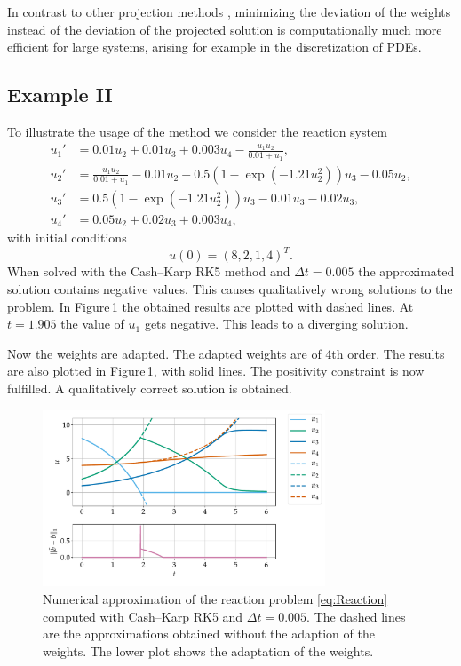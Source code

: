 \documentclass[a4paper]{article}
\numberwithin{equation}{section}
\theoremstyle{plain}
\theoremstyle{definition}
\numberwithin{theorem}{section}
\newcommand{\dt}{{\Delta t}}
\newcommand{\1}{\mathbbm{1}}
\begin{document}
In contrast to other projection methods
\cite{shampine1986conservation,sandu2001positive},
minimizing the deviation of the weights instead of the deviation
of the projected solution is computationally much more efficient
for large systems, arising for example in the discretization of
PDEs.


\subsection{Example II}\label{sec:example_reac}

To illustrate the usage of the method we consider the reaction system
\cite{kopecz_comparison_2019}
\begin{subequations}
\label{eq:Reaction}
\begin{align}
u_1' &= 0.01u_2 + 0.01 u_3 +0.003u_4 - \frac{u_1 u_2}{0.01+u_1}, \\
u_2' &= \frac{u_1u_2}{0.01+u_1}-0.01 u_2-0.5(1-\exp(-1.21 u_2^2)) u_3 -0.05 u_2, \\
u_3' &= 0.5(1-\exp(-1.21u_2^2)) u_3 - 0.01 u_3 -0.02 u_3, \\
u_4' &=0.05 u_2 + 0.02 u_3 + 0.003u_4,
\end{align}
\end{subequations}
with initial conditions
\begin{equation}
u(0) = (8,2,1,4)^T.
\end{equation}
When solved with the Cash--Karp RK5 method \cite{cash1990variable} and $\dt = 0.005$ the approximated solution contains negative values. This causes qualitatively wrong solutions to the problem.
In Figure\,\ref{fig:exampleI} the obtained results are plotted with dashed lines.
At $t=1.905$ the value of $u_1$ gets negative. This leads to a diverging solution.

Now the weights are adapted. The adapted weights are of 4th order. The results are also plotted in Figure\,\ref{fig:exampleI}, with solid lines.
The positivity constraint is now fulfilled. A qualitatively correct solution is obtained.

\begin{figure}[ht]
    \centering
    \includegraphics[width=0.75\textwidth]{plots/exampleI.pdf}
    \caption{Numerical approximation of the reaction problem \eqref{eq:Reaction} computed with Cash--Karp RK5 and $\dt = 0.005$. The dashed lines are the approximations obtained without the adaption of the weights. The lower plot shows the adaptation of the weights. }
    \label{fig:exampleI}
\end{figure}
\end{document}
